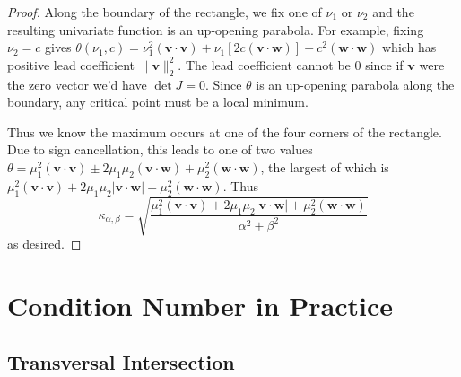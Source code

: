 \documentclass[3p, authoryear, square]{elsarticle}
\theoremstyle{definition}
\begin{document}
\begin{proof}
Along the boundary of the rectangle,
we fix one of \(\nu_1\) or \(\nu_2\) and the resulting univariate function is
an up-opening parabola. For example, fixing \(\nu_2 = c\) gives
\(\theta(\nu_1, c) =
\nu_1^2 \left(\bm{v} \cdot \bm{v}\right) +
\nu_1\left[2 c \left(\bm{v} \cdot \bm{w}\right)\right] +
c^2 \left(\bm{w} \cdot \bm{w}\right)\) which has positive lead coefficient
\(\|\bm{v}\|_2^2\). The lead coefficient cannot be \(0\) since if \(\bm{v}\)
were the zero vector we'd have \(\det J = 0\).
Since \(\theta\) is an up-opening parabola along the boundary, any critical
point must be a local minimum.

Thus we know the maximum occurs at one of the four corners of the
rectangle. Due to sign cancellation, this leads to one of two values
\(\theta =
\mu_1^2 \left(\bm{v} \cdot \bm{v}\right) \pm
2 \mu_1 \mu_2 \left(\bm{v} \cdot \bm{w}\right) +
\mu_2^2 \left(\bm{w} \cdot \bm{w}\right)\), the largest of which is
\(\mu_1^2 \left(\bm{v} \cdot \bm{v}\right) +
2 \mu_1 \mu_2 \left|\bm{v} \cdot \bm{w}\right| +
\mu_2^2 \left(\bm{w} \cdot \bm{w}\right)\). Thus
\begin{equation}\label{eq:intersect-cond-num-too}
\kappa_{\alpha, \beta} = \sqrt{\frac{\mu_1^2
  \left(\bm{v} \cdot \bm{v}\right) +
  2 \mu_1 \mu_2 \left|\bm{v} \cdot \bm{w}\right| +
  \mu_2^2 \left(\bm{w} \cdot \bm{w}\right)}{\alpha^2 + \beta^2}}
\end{equation}
as desired.
\end{proof}

\section{Condition Number in Practice}

\subsection{Transversal Intersection}
\end{document}
